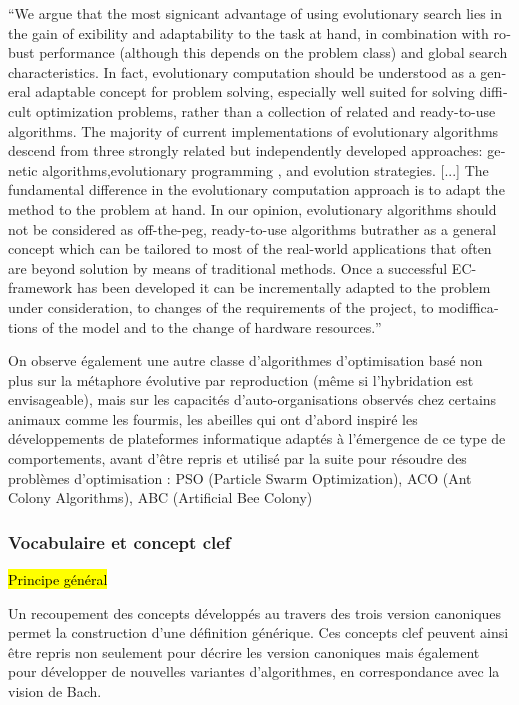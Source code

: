 \foreignquote{english}{We argue that the most signicant advantage of using evolutionary search lies in the gain of exibility and adaptability to the task at hand, in combination with robust performance (although this depends on the problem class) and global search characteristics. In fact, evolutionary computation should be understood as a general adaptable concept for problem solving, especially well suited for solving difficult optimization problems, rather than a collection of related and ready-to-use algorithms. The majority of current implementations of evolutionary algorithms descend from three strongly related but independently developed approaches: genetic algorithms,evolutionary programming , and evolution strategies. [...] 
The fundamental difference in the evolutionary computation approach is to adapt the method to the problem at hand. In our opinion, evolutionary algorithms should not be considered as off-the-peg, ready-to-use algorithms butrather as a general concept which can be tailored to most of the real-world applications that often are beyond solution by means of traditional methods. Once a successful EC-framework has been developed it can be incrementally adapted to the problem under consideration, to changes of the requirements of the project, to modiffications of the
model and to the change of hardware resources.} \autocite{Back1997a}

On observe également une autre classe d'algorithmes d'optimisation basé non plus sur la métaphore évolutive par reproduction (même si l'hybridation est envisageable), mais sur les capacités d'auto-organisations observés chez certains animaux comme les fourmis, les abeilles qui ont d'abord inspiré les développements de plateformes informatique adaptés à l'émergence de ce type de comportements, avant d'être repris et utilisé par la suite pour résoudre des problèmes d'optimisation : PSO (Particle Swarm Optimization), ACO (Ant Colony Algorithms), ABC (Artificial Bee Colony)

\subsubsection{Vocabulaire et concept clef}




\hl{Principe général}

Un recoupement des concepts développés au travers des trois version canoniques permet la construction d'une définition générique. Ces concepts clef peuvent ainsi être repris non seulement pour décrire les version canoniques mais également pour développer de nouvelles variantes d'algorithmes, en correspondance avec la vision de Bach.

